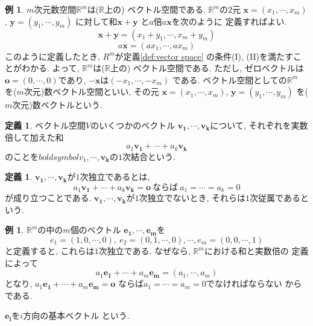 \documentclass[a4j,12pt]{jarticle}
\theoremstyle{definition}
\newtheorem{definition}[theorem]{定義}
\newtheorem{example}[theorem]{例}
\begin{document}
\begin{example}
    $m$次元数空間$\mathbb{R}^m$は($\mathbb{R}$上の)
    ベクトル空間である. 
    $\mathbb{R}^m$の$2$元
    $\boldsymbol{x}=(x_1,\cdots ,x_m)$, 
    $\boldsymbol{y}=(y_1,\cdots ,y_m)$
    に対して和$\boldsymbol{x}+\boldsymbol{y}$
    と$a$倍$a\boldsymbol{x}$を次のように
    定義すればよい. 
    $$\boldsymbol{x}+\boldsymbol{y}=
    (x_1+y_1,\cdots ,x_m+y_m)$$
    $$a\boldsymbol{x}=(ax_1,\cdots ,ax_m)$$
    このように定義したとき, $R^m$が定義\ref{def:vector space}
    の条件(I), (II)を満たすことがわかる. 
    よって, $\mathbb{R}^m$は($\mathbb{R}$上の)
    ベクトル空間である. ただし, ゼロベクトルは
    $\boldsymbol{o}=(0,\cdots ,0)$であり, 
    $-\boldsymbol{x}$は$(-x_1,\cdots ,-x_m)$
    である. ベクトル空間としての$\mathbb{R}^m$
    を($m$次元)数ベクトル空間といい, その元
    $\boldsymbol{x}=(x_1,\cdots ,x_m)$, 
    $\boldsymbol{y}=(y_1,\cdots ,y_m)$
    を($m$次元)数ベクトルという. 
\end{example}
\begin{definition}
    ベクトル空間$V$のいくつかのベクトル
    $\boldsymbol{v_1},\cdots ,
    \boldsymbol{v_k}$について, それぞれを実数倍して加えた和
    $$a_1\boldsymbol{v_1}+\cdots +
    a_k\boldsymbol{v_k}$$
    のことを$boldsymbol{v_1},\cdots ,
    \boldsymbol{v_k}$の$1$次結合という. 
\end{definition}
\begin{definition}
    $\boldsymbol{v_1},\cdots ,
    \boldsymbol{v_k}$が$1$次独立であるとは, 
    $$a_1\boldsymbol{v_1}+\cdots +
    a_k\boldsymbol{v_k}=\boldsymbol{o}\ 
    \text{ならば}\ a_1=\cdots =a_k=0$$
    が成り立つことである. 
    $\boldsymbol{v_1},\cdots ,
    \boldsymbol{v_k}$が$1$次独立でないとき, 
    それらは$1$次従属であるという. 
\end{definition}
\begin{example}\label{def:fundamental vector of R^m}
    $\mathbb{R}^m$の中の$m$個のベクトル
    $\boldsymbol{e_1},\cdots ,
    \boldsymbol{e_m}$を
    $$e_1=(1,0,\cdots ,0),\ e_2=(0,1,\cdots ,0), 
    \cdots ,e_m=(0,0,\cdots ,1)$$
    と定義すると, これらは$1$次独立である. 
    なぜなら, $\mathbb{R}^m$における和と実数倍の
    定義によって
    $$a_1\boldsymbol{e_1}+\cdots +a_m\boldsymbol{e_m}
    =(a_1,\cdots ,a_m)$$
    となり, $a_1\boldsymbol{e_1}+\cdots +
    a_m\boldsymbol{e_m}=\boldsymbol{o}$
    ならば$a_1=\cdots =a_m=0$でなければならない
    からである. 

    $\boldsymbol{e_i}$を$i$方向の基本ベクトル
    という. 
\end{example}
\end{document}
